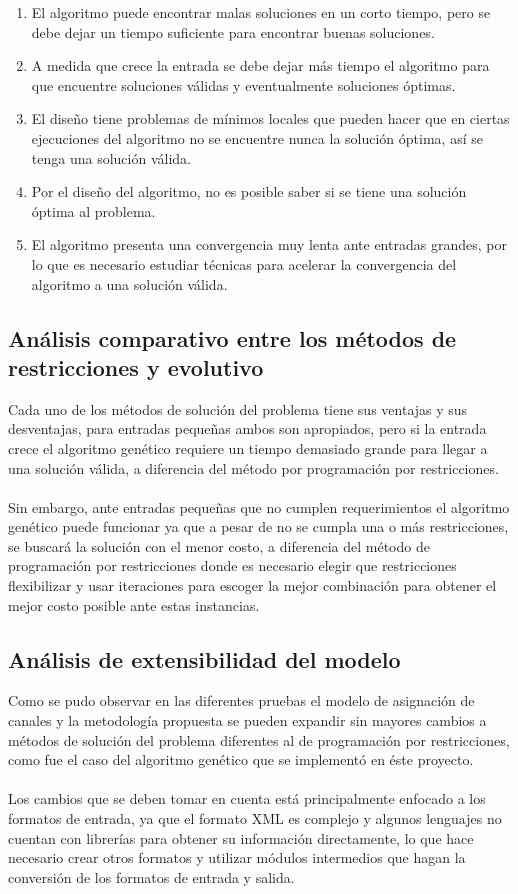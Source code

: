 \begin{enumerate}
	\item El algoritmo puede encontrar malas soluciones en un corto tiempo, pero se debe dejar un tiempo suficiente para encontrar buenas soluciones.
	\item A medida que crece la entrada se debe dejar más tiempo el algoritmo para que encuentre soluciones válidas y eventualmente soluciones óptimas.
	\item El diseño tiene problemas de mínimos locales que pueden hacer que en ciertas ejecuciones del algoritmo no se encuentre nunca la solución óptima, así se tenga una solución válida.
	\item Por el diseño del algoritmo, no es posible saber si se tiene una solución óptima al problema.
	\item El algoritmo presenta una convergencia muy lenta ante entradas grandes, por lo que es necesario estudiar técnicas para acelerar la convergencia del algoritmo a una solución válida.
\end{enumerate}

\subsection{Análisis comparativo entre los métodos de restricciones y evolutivo}

Cada uno de los métodos de solución del problema tiene sus ventajas y sus desventajas, para entradas pequeñas ambos son apropiados, pero si la entrada crece el algoritmo genético requiere un tiempo demasiado grande para llegar a una solución válida, a diferencia del método por programación por restricciones.
\\\\
Sin embargo, ante entradas pequeñas que no cumplen requerimientos el algoritmo genético puede funcionar ya que a pesar de no se cumpla una o más restricciones, se buscará la solución con el menor costo, a diferencia del método de programación por restricciones donde es necesario elegir que restricciones flexibilizar y usar iteraciones para escoger la mejor combinación para obtener el mejor costo posible ante estas instancias.

\subsection{Análisis de extensibilidad del modelo}

Como se pudo observar en las diferentes pruebas el modelo de asignación de canales y la metodología propuesta se pueden expandir sin mayores cambios a métodos de solución del problema diferentes al de programación por restricciones, como fue el caso del algoritmo genético que se implementó en éste proyecto.
\\\\
Los cambios que se deben tomar en cuenta está principalmente enfocado a los formatos de entrada, ya que el formato XML es complejo y algunos lenguajes no cuentan con librerías para obtener su información directamente, lo que hace necesario crear otros formatos y utilizar módulos intermedios que hagan la conversión de los formatos de entrada y salida.


